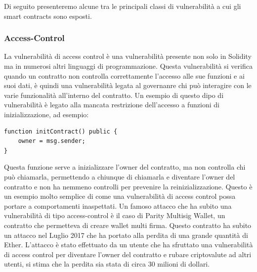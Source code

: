 \documentclass[../../Thesis.tex]{subfiles}
\begin{document}
Di seguito presenteremo alcune tra le principali classi di vulnerabilità a cui gli smart contracts sono esposti.

\subsubsection{Access-Control}
La vulnerabilità di access control è una vulnerabilità presente non solo in Solidity ma in numerosi altri linguaggi di programmazione. Questa vulnerabilità si verifica quando un contratto non controlla correttamente l'accesso alle sue funzioni e ai suoi dati, è quindi una vulnerabilità legata al governanre chi può interagire con le varie funzionalità all'interno del contratto. Un esempio di questo dipo di vulnerabilità è legato alla mancata restrizione dell'accesso a funzioni di inizializzazione, ad esempio:
\begin{lstlisting}[language=Solidity]
function initContract() public {
    owner = msg.sender;
}
\end{lstlisting} 
Questa funzione serve a inizializzare l'owner del contratto, ma non controlla chi può chiamarla, permettendo a chiunque di chiamarla e diventare l'owner del contratto e non ha nemmeno controlli per prevenire la reinizializzazione. Questo è un esempio molto semplice di come una vulnerabilità di access control possa portare a comportamenti inaspettati. 
Un famoso attacco che ha subito una vulnerabilità di tipo access-control è il caso di Parity Multisig Wallet, un contratto che permetteva di creare wallet multi firma. Questo contratto ha subito un attacco nel Luglio 2017 che ha portato alla perdita di una grande quantità di Ether. L'attacco è stato effettuato da un utente che ha sfruttato una vulnerabilità di access control per diventare l'owner del contratto e rubare criptovalute ad altri utenti, si stima che la perdita sia stata di circa 30 milioni di dollari.
\end{document}
